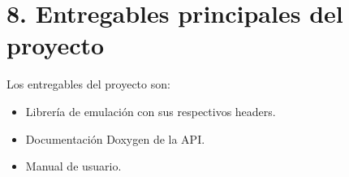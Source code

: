 \section{8. Entregables principales del proyecto}
\label{sec:8-entregables-principales-del-proyecto}

Los entregables del proyecto son:

\begin{itemize}
	\item Librería de emulación con sus respectivos headers.
	\item Documentación Doxygen de la API.
	\item Manual de usuario.
\end{itemize}

